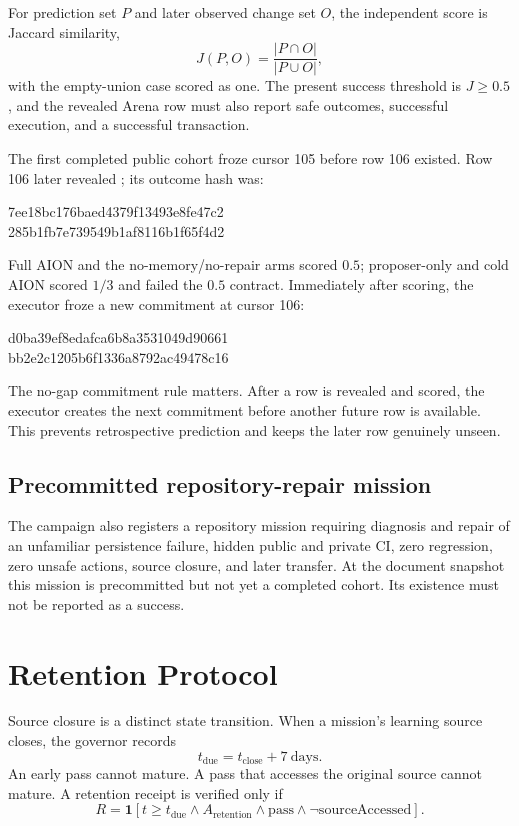 \documentclass[11pt,a4paper]{article}
\newcommand{\codepath}[1]{\path{#1}}
\newcommand{\displayhash}[2]{%
  \begin{center}\scriptsize\ttfamily #1\\#2\end{center}}
\begin{document}
For prediction set $P$ and later observed change set $O$, the independent
score is Jaccard similarity,
\begin{equation}
J(P,O)=\frac{|P\cap O|}{|P\cup O|},
\label{eq:jaccard}
\end{equation}
with the empty-union case scored as one.  The present success threshold is
$J\geq 0.5$, and the revealed Arena row must also report safe outcomes,
successful execution, and a successful transaction.

The first completed public cohort froze cursor 105 before row 106 existed.
Row 106 later revealed \codepath{open_meteo_madrid}; its outcome hash was:
\displayhash{7ee18bc176baed4379f13493e8fe47c2}{285b1fb7e739549b1af8116b1f65f4d2}
Full AION and the no-memory/no-repair arms scored $0.5$; proposer-only and cold
AION scored $1/3$ and failed the $0.5$ contract.  Immediately after scoring,
the executor froze a new commitment at cursor 106:
\displayhash{d0ba39ef8edafca6b8a3531049d90661}{bb2e2c1205b6f1336a8792ac49478c16}

The no-gap commitment rule matters.  After a row is revealed and scored, the
executor creates the next commitment before another future row is available.
This prevents retrospective prediction and keeps the later row genuinely
unseen.

\subsection{Precommitted repository-repair mission}

The campaign also registers a repository mission requiring diagnosis and
repair of an unfamiliar persistence failure, hidden public and private CI,
zero regression, zero unsafe actions, source closure, and later transfer.
At the document snapshot this mission is precommitted but not yet a completed
cohort.  Its existence must not be reported as a success.

\section{Retention Protocol}
\label{sec:retention}

Source closure is a distinct state transition.  When a mission's learning
source closes, the governor records
\begin{equation}
t_{\mathrm{due}}=t_{\mathrm{close}}+7\ \mathrm{days}.
\end{equation}
An early pass cannot mature.  A pass that accesses the original source cannot
mature.  A retention receipt is verified only if
\begin{equation}
R=\mathbf{1}\!\left[
t\geq t_{\mathrm{due}}
\land A_{\mathrm{retention}}
\land \mathrm{pass}
\land \neg\mathrm{sourceAccessed}
\right].
\label{eq:retention}
\end{equation}
\end{document}
